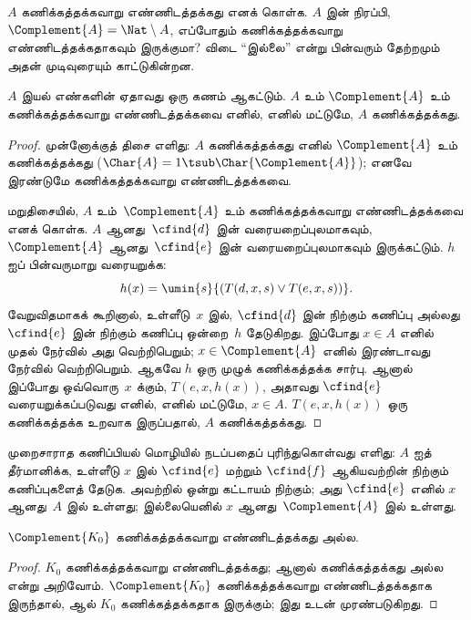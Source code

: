 \documentclass[../../../include/open-logic-section]{subfiles}
\begin{document}


$A$ கணிக்கத்தக்கவாறு எண்ணிடத்தக்கது எனக் கொள்க. $A$ இன் நிரப்பி,
$\Complement{A} = \Nat \setminus A$, எப்போதும் கணிக்கத்தக்கவாறு
எண்ணிடத்தக்கதாகவும் இருக்குமா? விடை ``இல்லை'' என்று பின்வரும்
தேற்றமும் அதன் முடிவுரையும் காட்டுகின்றன.

\begin{thm}
$A$ இயல் எண்களின் ஏதாவது ஒரு கணம் ஆகட்டும். $A$ உம்
$\Complement{A}$ உம் கணிக்கத்தக்கவாறு எண்ணிடத்தக்கவை எனில், எனில்
மட்டுமே, $A$ கணிக்கத்தக்கது.
\end{thm}

\begin{proof}
முன்னோக்குத் திசை எளிது: $A$ கணிக்கத்தக்கது எனில்
$\Complement{A}$ உம் கணிக்கத்தக்கது
($\Char{A} = 1 \tsub \Char{\Complement{A}}$); எனவே இரண்டுமே
கணிக்கத்தக்கவாறு எண்ணிடத்தக்கவை.

மறுதிசையில், $A$ உம்~$\Complement{A}$ உம் கணிக்கத்தக்கவாறு
எண்ணிடத்தக்கவை எனக் கொள்க. $A$ ஆனது~$\cfind{d}$ இன்
வரையறைப்புலமாகவும், $\Complement{A}$ ஆனது~$\cfind{e}$ இன்
வரையறைப்புலமாகவும் இருக்கட்டும். $h$ ஐப் பின்வருமாறு வரையறுக்க:
\[
h(x) = \umin{s}{(T(d,x,s) \lor T(e,x,s))}.
\]
வேறுவிதமாகக் கூறினால், உள்ளீடு~$x$ இல், $\cfind{d}$ இன் நிற்கும்
கணிப்பு அல்லது $\cfind{e}$ இன் நிற்கும் கணிப்பு ஒன்றை~$h$ தேடுகிறது.
இப்போது $x \in A$ எனில் முதல் நேர்வில் அது வெற்றிபெறும்; $x \in
\Complement{A}$ எனில் இரண்டாவது நேர்வில் வெற்றிபெறும். ஆகவே $h$
ஒரு முழுக் கணிக்கத்தக்க சார்பு. ஆனால் இப்போது ஒவ்வொரு~$x$ க்கும்,
$T(e, x, h(x))$, அதாவது $\cfind{e}$ வரையறுக்கப்படுவது எனில், எனில்
மட்டுமே, $x \in A$. $T(e, x, h(x))$ ஒரு கணிக்கத்தக்க உறவாக இருப்பதால்,
$A$ கணிக்கத்தக்கது.
\end{proof}

\begin{explain}
முறைசாராத கணிப்பியல் மொழியில் நடப்பதைப் புரிந்துகொள்வது எளிது:
$A$ ஐத் தீர்மானிக்க, உள்ளீடு $x$ இல் $\cfind{e}$ மற்றும்
$\cfind{f}$ ஆகியவற்றின் நிற்கும் கணிப்புகளைத் தேடுக. அவற்றில் ஒன்று
கட்டாயம் நிற்கும்; அது $\cfind{e}$ எனில் $x$ ஆனது~$A$ இல் உள்ளது;
இல்லையெனில் $x$ ஆனது~$\Complement{A}$ இல் உள்ளது.
\end{explain}

\begin{cor}
$\Complement{K_0}$ கணிக்கத்தக்கவாறு எண்ணிடத்தக்கது அல்ல.
\end{cor}

\begin{proof}
$K_0$ கணிக்கத்தக்கவாறு எண்ணிடத்தக்கது; ஆனால் கணிக்கத்தக்கது அல்ல
என்று அறிவோம். $\Complement{K_0}$ கணிக்கத்தக்கவாறு எண்ணிடத்தக்கதாக
இருந்தால்,  ஆல் $K_0$ கணிக்கத்தக்கதாக இருக்கும்;
இது  உடன் முரண்படுகிறது.
\end{proof}
\end{document}
